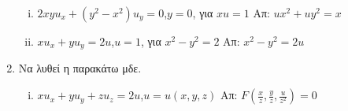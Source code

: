 \begin{enumerate}
\begin{enumerate}[i)]
      \item $2xyu_{x}+(y^{2}-x^{2})u_{y}=0$,\quad $y=0$, για $xu=1$ 
        \hfill Απ: $ux^{2}+uy^{2}=x$
      \item $xu_{x}+yu_{y}=2u$,\quad $u=1$, για $x^{2}-y^{2}=2$ 
        \hfill Απ: $x^{2}-y^{2}=2u$
    \end{enumerate}

  \item Να λυθεί η παρακάτω μδε.
    \begin{enumerate}[i)]
      \item $xu_{x}+yu_{y}+zu_{z}=2u$,\quad $u=u(x,y,z)$ \hfill Απ: $F(\frac{x}{z},\frac{y}{z},\frac{u}{z^{2}})=0$

    \end{enumerate}
\end{enumerate}


